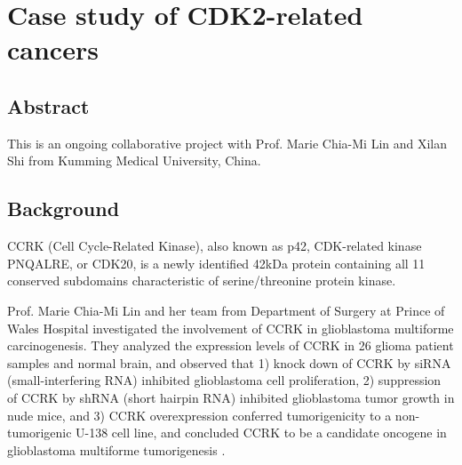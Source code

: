 \chapter{Case study of CDK2-related cancers}

\section{Abstract}

This is an ongoing collaborative project with Prof. Marie Chia-Mi Lin and Xilan Shi from Kumming Medical University, China.


\section{Background}

CCRK (Cell Cycle-Related Kinase), also known as p42, CDK-related kinase PNQALRE, or CDK20, is a newly identified 42kDa protein containing all 11 conserved subdomains characteristic of serine/threonine protein kinase.

Prof. Marie Chia-Mi Lin and her team from Department of Surgery at Prince of Wales Hospital investigated the involvement of CCRK in glioblastoma multiforme carcinogenesis. They analyzed the expression levels of CCRK in 26 glioma patient samples and normal brain, and observed that 1) knock down of CCRK by siRNA (small-interfering RNA) inhibited glioblastoma cell proliferation, 2) suppression of CCRK by shRNA (short hairpin RNA) inhibited glioblastoma tumor growth in nude mice, and 3) CCRK overexpression conferred tumorigenicity to a non-tumorigenic U-138 cell line, and concluded CCRK to be a candidate oncogene in glioblastoma multiforme tumorigenesis \citep{1144}.

